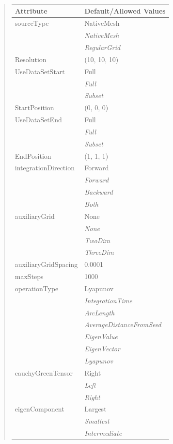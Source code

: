 \documentclass[letterpaper,10pt,english]{sphinxmanual}
\begin{document}
\begin{quote}
\begin{longtable}{|l|l|}
\textbf{Attribute}
 & 
\textbf{Default/Allowed Values}
\\
\hline
sourceType
 & 
NativeMesh
\\
\hline & 
\emph{NativeMesh}
\\
\hline & 
\emph{RegularGrid}
\\
\hline
Resolution
 & 
(10, 10, 10)
\\
\hline
UseDataSetStart
 & 
Full
\\
\hline & 
\emph{Full}
\\
\hline & 
\emph{Subset}
\\
\hline
StartPosition
 & 
(0, 0, 0)
\\
\hline
UseDataSetEnd
 & 
Full
\\
\hline & 
\emph{Full}
\\
\hline & 
\emph{Subset}
\\
\hline
EndPosition
 & 
(1, 1, 1)
\\
\hline
integrationDirection
 & 
Forward
\\
\hline & 
\emph{Forward}
\\
\hline & 
\emph{Backward}
\\
\hline & 
\emph{Both}
\\
\hline
auxiliaryGrid
 & 
None
\\
\hline & 
\emph{None}
\\
\hline & 
\emph{TwoDim}
\\
\hline & 
\emph{ThreeDim}
\\
\hline
auxiliaryGridSpacing
 & 
0.0001
\\
\hline
maxSteps
 & 
1000
\\
\hline
operationType
 & 
Lyapunov
\\
\hline & 
\emph{IntegrationTime}
\\
\hline & 
\emph{ArcLength}
\\
\hline & 
\emph{AverageDistanceFromSeed}
\\
\hline & 
\emph{EigenValue}
\\
\hline & 
\emph{EigenVector}
\\
\hline & 
\emph{Lyapunov}
\\
\hline
cauchyGreenTensor
 & 
Right
\\
\hline & 
\emph{Left}
\\
\hline & 
\emph{Right}
\\
\hline
eigenComponent
 & 
Largest
\\
\hline & 
\emph{Smallest}
\\
\hline & 
\emph{Intermediate}
\\

\end{longtable}
\end{quote}
\end{document}
